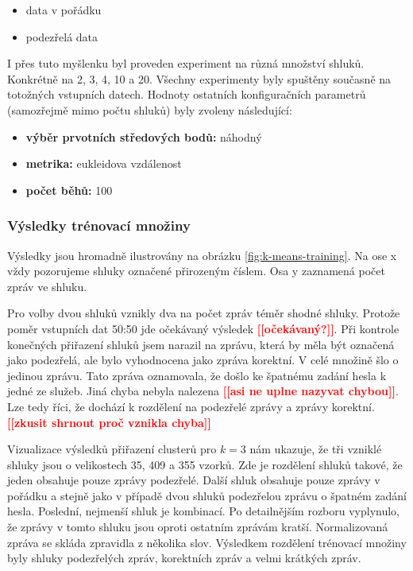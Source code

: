 \documentclass[thesis=M,czech]{FITthesis}[2012/10/20]
\newcommand{\todo}[1]{\textcolor{red}{\textbf{[[#1]]}}}
\begin{document}
			\begin{itemize} 
				\item data v pořádku
				\item podezřelá data		
			\end{itemize}
		
			I přes tuto myšlenku byl proveden experiment na různá množství shluků. Konkrétně na 2, 3, 4, 10 a 20. Všechny experimenty byly spuštěny současně na totožných vstupních datech. Hodnoty ostatních konfiguračních parametrů (samozřejmě mimo počtu shluků) byly zvoleny následující:
			
			\begin{itemize} 
				\item \textbf{výběr prvotních středových bodů: } náhodný
				\item \textbf{metrika: } eukleidova vzdálenost
				\item \textbf{počet běhů: } 100		
			\end{itemize}
		
			\subsubsection{Výsledky trénovací množiny}
				Výsledky jsou hromadně ilustrovány na obrázku \ref{fig:k-means-training}. Na ose x vždy pozorujeme shluky označené přirozeným číslem. Osa y zaznamená počet zpráv ve shluku.
				
				Pro volby dvou shluků vznikly dva na počet zpráv téměr shodné shluky. Protože poměr vstupních dat 50:50 jde očekávaný výsledek \todo{očekávaný?}. Při kontrole konečných přiřazení shluků jsem narazil na zprávu, která by měla být označená jako podezřelá, ale bylo vyhodnocena jako zpráva korektní. V celé množině šlo o jedinou zprávu. Tato zpráva oznamovala, že došlo ke špatnému zadání hesla k jedné ze služeb. Jiná chyba nebyla nalezena \todo{asi ne uplne nazyvat chybou}. Lze tedy říci, že dochází k rozdělení na podezřelé zprávy a zprávy korektní. \todo{zkusit shrnout proč vznikla chyba}
				
				Vizualizace výsledků přiřazení clusterů pro $k = 3$ nám ukazuje, že tři vzniklé shluky jsou o velikostech 35, 409 a 355 vzorků. Zde je rozdělení shluků takové, že jeden obsahuje pouze zprávy podezřelé. Další shluk obsahuje pouze zprávy v pořádku a stejně jako v případě dvou shluků podezřelou zprávu o špatném zadání hesla. Poslední, nejmenší shluk je kombinací. Po detailnějším rozboru vyplynulo, že zprávy v tomto shluku jsou oproti ostatním zprávám kratší. Normalizovaná zpráva se skláda zpravidla z několika slov. Výsledkem rozdělení trénovací množiny byly shluky podezřelých zpráv, korektních zpráv a velmi krátkých zpráv.
				
\end{document}
